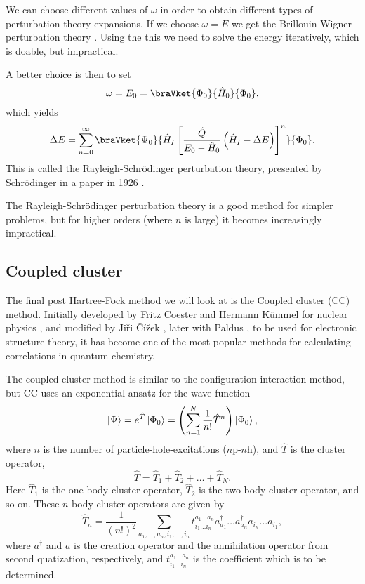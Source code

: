 		We can choose different values of $\omega$ in order to obtain different types of perturbation theory expansions. If we choose $\omega=E$ we get the Brillouin-Wigner perturbation theory \cite{brillouin32} \cite{wigner35}. Using the this we need to solve the energy iteratively, which is doable, but impractical. 

		A better choice is then to set 
		\[
			\omega = E_0 = \braVket{\Phi_0}{\hat{H}_0}{\Phi_0},
		\]
		which yields
		\begin{equation}
			\Delta E  = \sum_{n=0}^{\infty} \braVket{\Psi_0}{\hat{H}_I\left[ \frac{\hat{Q}}{E_0-\hat{H}_0}\left( \hat{H}_I - \Delta E \right) \right]^{n}}{\Phi_0}.
		\end{equation}
		This is called the Rayleigh-Schrödinger perturbation theory, presented by Schrödinger in a paper in 1926 \cite{schrodinger26}.

		The Rayleigh-Schrödinger perturbation theory is a good method for simpler problems, but for higher orders (where $n$ is large) it becomes increasingly impractical.


	\subsection{Coupled cluster}
		The final post Hartree-Fock method we will look at is the Coupled cluster (CC) method. Initially developed by Fritz Coester and Hermann Kümmel for nuclear physics \cite{coester1960}, and modified by Jiři Čížek \cite{cizek1966} \cite{cizek1969}, later with Paldus \cite{cizek1971}, to be used for electronic structure theory, it has become one of the most popular methods for calculating correlations in quantum chemistry.

		The coupled cluster method is similar to the configuration interaction method, but CC uses an exponential ansatz for the wave function
		\begin{equation} \label{eq:CC_Psi}
			\ket{\Psi} = e^{\hat{T}}\ket{\Phi_0}=\left( \sum_{n=1}^{N} \frac{1}{n!} \hat{T}^{n} \right)\ket{\Phi_0},
		\end{equation}
		where $n$ is the number of particle-hole-excitations ($n$p-$n$h), and $\hat{T}$ is the cluster operator,
		\begin{equation} \label{eq:CC_T_operator}
			\hat{T} = \hat{T}_1 + \hat{T}_2 + \dots + \hat{T}_N.
		\end{equation}
		Here $\hat{T}_1$ is the one-body cluster operator, $\hat{T}_2$ is the two-body cluster operator, and so on. These $n$-body cluster operators are given by		
		\begin{equation}
			\hat{T}_n = \frac{1}{\left(n!\right )^{2}}  \sum_{a_1, \dots, a_n, i_1, \dots, i_n} t_{i_1\dots i_n}^{a_1 \dots a_n} a_{a_1}^{\dagger}\dots a_{a_n}^{\dagger} a_{i_n} \dots a_{i_1},
		\end{equation}
		where $a^{\dagger}$ and $a$ is the creation operator and the annihilation operator from second quatization, respectively, and $t^{a_1 \dots a_n }_{i_1 \dots i_n}$ is the coefficient which is to be determined. 

